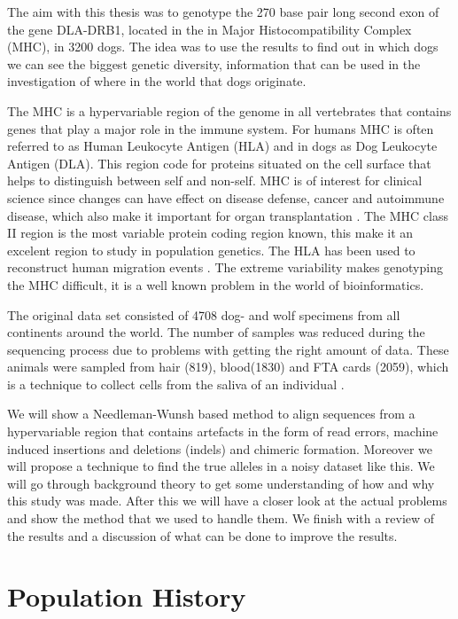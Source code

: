 \documentclass[a4paper,11pt]{kth-mag}
\begin{document}
The aim with this thesis was to genotype the 270 base pair long second exon of the gene DLA-DRB1, located in the in {M}ajor {H}istocompatibility {C}omplex ({MHC}), in 3200 dogs. The idea was to use the results to find out in which dogs we can see the biggest genetic diversity, information that can be used in the investigation of where in the world that dogs originate.



The {MHC} is a hypervariable region of the genome in all vertebrates that contains genes that play a major role in the immune system. For humans MHC is often referred to as Human Leukocyte Antigen (HLA) and in dogs as Dog Leukocyte Antigen (DLA). This region code for proteins situated on the cell surface that helps to distinguish between self and non-self\cite{apanius97}. {MHC} is of interest for clinical science since changes can have effect on disease defense, cancer and autoimmune disease, which also make it important for organ transplantation \cite{hla_typing}. The MHC class II region is the most variable protein coding region known, this make it an excelent region to study in population genetics. The HLA has been used to reconstruct human migration events \cite{abdennaji06,di11,buhler06}. The extreme variability makes genotyping the MHC difficult, it is a well known problem in the world of bioinformatics.

The original data set consisted of 4708 dog- and wolf specimens from all continents around the world. The number of samples was reduced during the sequencing process due to problems with getting the right amount of data. These animals were sampled from hair (819), blood(1830) and FTA cards (2059), which is a technique to collect cells from the saliva of an individual \cite{neiman11}.

We will show a Needleman-Wunsh\cite{nw} based method to align sequences from a hypervariable region that contains artefacts in the form of read errors, machine induced insertions and deletions (indels) and chimeric formation. Moreover we will propose a technique to find the true alleles in a noisy dataset like this. 
We will go through background theory to get some understanding of how and why this study was made. After this we will have a closer look at the actual problems and show the method that we used to handle them. We finish with a review of the results and a discussion of what can be done to improve the results.



\section{Population History}
\end{document}
